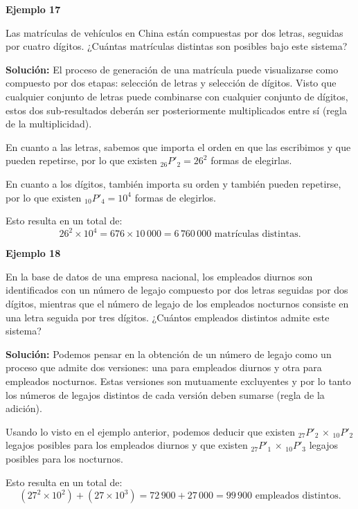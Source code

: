 \documentclass[
  letterpaper,
  DIV=11,
  numbers=noendperiod]{scrreprt}
\begin{document}
\begin{examplebox}

\begin{center}
\textbf{Ejemplo 17}

\end{center}

Las matrículas de vehículos en China están compuestas por dos letras,
seguidas por cuatro dígitos. ¿Cuántas matrículas distintas son posibles
bajo este sistema?

\textbf{Solución:} El proceso de generación de una matrícula puede
visualizarse como compuesto por dos etapas: selección de letras y
selección de dígitos. Visto que cualquier conjunto de letras puede
combinarse con cualquier conjunto de dígitos, estos dos sub-resultados
deberán ser posteriormente multiplicados entre sí (regla de la
multiplicidad).

En cuanto a las letras, sabemos que importa el orden en que las
escribimos y que pueden repetirse, por lo que existen
\(_{26}P'_2 = 26^2\) formas de elegirlas.

En cuanto a los dígitos, también importa su orden y también pueden
repetirse, por lo que existen \(_{10}P'_4 = 10^4\) formas de elegirlos.

Esto resulta en un total de:
\[26^2 \times 10^4 = 676 \times 10\,000 = 6\,760\,000 \text{ matrículas distintas.}\]

\end{examplebox}

\begin{examplebox}

\begin{center}
\textbf{Ejemplo 18}

\end{center}

En la base de datos de una empresa nacional, los empleados diurnos son
identificados con un número de legajo compuesto por dos letras seguidas
por dos dígitos, mientras que el número de legajo de los empleados
nocturnos consiste en una letra seguida por tres dígitos. ¿Cuántos
empleados distintos admite este sistema?

\textbf{Solución:} Podemos pensar en la obtención de un número de legajo
como un proceso que admite dos versiones: una para empleados diurnos y
otra para empleados nocturnos. Estas versiones son mutuamente
excluyentes y por lo tanto los números de legajos distintos de cada
versión deben sumarse (regla de la adición).

Usando lo visto en el ejemplo anterior, podemos deducir que existen
\(_{27}P'_2 \,\times\, _{10}P'_2\) legajos posibles para los empleados
diurnos y que existen \(_{27}P'_1 \,\times\, _{10}P'_3\) legajos
posibles para los nocturnos.

Esto resulta en un total de:
\[(27^2 \times 10^2) + (27 \times 10^3) = 72\,900 + 27\,000 = 99\,900 \text{ empleados distintos.}\]

\end{examplebox}
\end{document}

